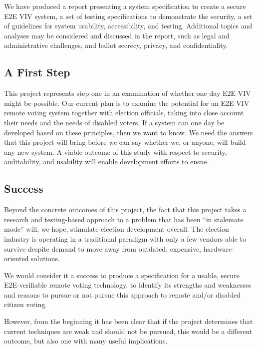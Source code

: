 We have produced a report presenting a system specification to create
a secure E2E VIV system, a set of testing specifications to
demonstrate the security, a set of guidelines for system usability,
accessibility, and testing. Additional topics and analyses may be
considered and discussed in the report, such as legal and
administrative challenges, and ballot secrecy, privacy, and
confidentiality.

\subsection{A First Step}
\label{sec:first-step}

This project represents step one in an examination of whether one day
E2E VIV might be possible. Our current plan is to examine the
potential for an E2E VIV remote voting system together with election
officials, taking into close account their needs and the needs of
disabled voters. If a system can one day be developed based on these
principles, then we want to know. We need the answers that this
project will bring before we can say whether we, or anyone, will build
any new system. A viable outcome of this study with respect to
security, auditability, and usability will enable development efforts
to ensue.

\subsection{Success}
\label{sec:success}

Beyond the concrete outcomes of this project, the fact that this
project takes a research and testing-based approach to a problem that
has been “in stalemate mode” will, we hope, stimulate election
development overall. The election industry is operating in a
traditional paradigm with only a few vendors able to survive despite
demand to move away from outdated, expensive, hardware-oriented
solutions.

We would consider it a success to produce a specification for a
usable, secure E2E-verifiable remote voting technology, to identify
its strengths and weaknesses and reasons to pursue or not pursue this
approach to remote and/or disabled citizen voting.

However, from the beginning it has been clear that if the project
determines that current techniques are weak and should not be pursued,
this would be a different outcome, but also one with many useful
implications.

